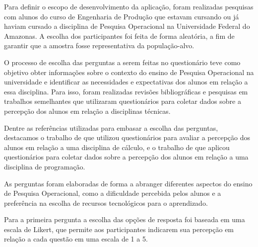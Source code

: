\documentclass{article}
\begin{document}
Para definir o escopo de desenvolvimento da aplicação, foram realizadas pesquisas com alunos do curso de Engenharia de Produção que estavam cursando ou já haviam cursado a disciplina de Pesquisa Operacional na Universidade Federal do Amazonas. A escolha dos participantes foi feita de forma aleatória, a fim de garantir que a amostra fosse representativa da população-alvo.

O processo de escolha das perguntas a serem feitas no questionário teve como objetivo obter informações sobre o contexto do ensino de Pesquisa Operacional na universidade e identificar as necessidades e expectativas dos alunos em relação a essa disciplina. Para isso, foram realizadas revisões bibliográficas e pesquisas em trabalhos semelhantes que utilizaram questionários para coletar dados sobre a percepção dos alunos em relação a disciplinas técnicas.

Dentre as referências utilizadas para embasar a escolha das perguntas, destacamos o trabalho de  que utilizou questionários para avaliar a percepção dos alunos em relação a uma disciplina de cálculo, e o trabalho de  que aplicou questionários para coletar dados sobre a percepção dos alunos em relação a uma disciplina de programação.

As perguntas foram elaboradas de forma a abranger diferentes aspectos do ensino de Pesquisa Operacional, como a dificuldade percebida pelos alunos e a preferência na escolha de recursos tecnológicos para o aprendizado.

Para a primeira pergunta a escolha das opções de resposta foi baseada em uma escala de Likert, que permite aos participantes indicarem sua percepção em relação a cada questão em uma escala de 1 a 5.
\end{document}
